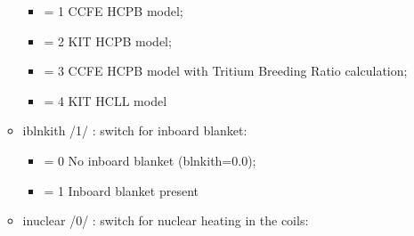 \documentclass[
]{article}
\providecommand{\tightlist}{%
  \setlength{\itemsep}{0pt}\setlength{\parskip}{0pt}}
\begin{document}
\begin{itemize}
\begin{itemize}
    \begin{itemize}
    \tightlist
    \item
      = 1 CCFE HCPB model;
    \item
      = 2 KIT HCPB model;
    \item
      = 3 CCFE HCPB model with Tritium Breeding Ratio calculation;
    \item
      = 4 KIT HCLL model
    \end{itemize}
  \item
    iblnkith /1/ : switch for inboard blanket:

    \begin{itemize}
    \tightlist
    \item
      = 0 No inboard blanket (blnkith=0.0);
    \item
      = 1 Inboard blanket present
    \end{itemize}
  \item
    inuclear /0/ : switch for nuclear heating in the coils:


\end{itemize}
\end{itemize}
\end{document}
